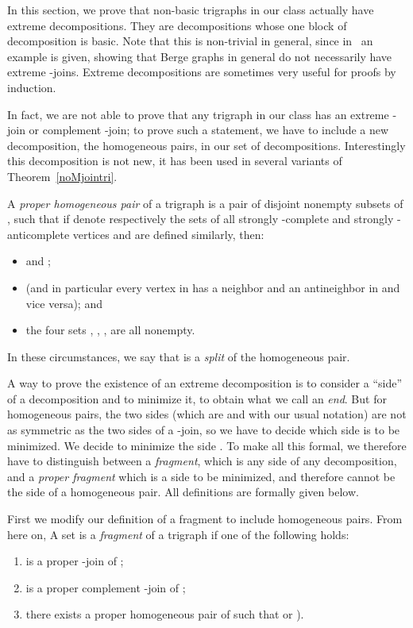 \documentclass[11 pt] {article}
\begin{document}
In this section, we prove that non-basic trigraphs in our class
actually have extreme decompositions. They are decompositions whose
one block of decomposition is basic. Note that this is non-trivial in
general, since in~\cite{nicolas.kristina:2-join} an example
is given, showing that Berge graphs in general do not necessarily have
extreme -joins.  Extreme decompositions are sometimes very useful
for proofs by induction.

In fact, we are not able to prove that any trigraph in our class has
an extreme -join or complement -join; to prove such a statement,
we have to include a new decomposition, the homogeneous pairs, in our
set of decompositions.  Interestingly this decomposition is not new,
it has been used in several variants of Theorem~\ref{noMjointri}.

A {\em proper homogeneous pair} of a trigraph  is a pair of
disjoint nonempty subsets  of , such that if 
denote respectively the sets of all strongly -complete and strongly
-anticomplete vertices and  are defined similarly, then:
\begin{itemize}
\item  and ;
\item 
(and in particular every vertex in  has a neighbor and an 
antineighbor in  and vice versa); and 
\item the four sets , , , 
 are all nonempty.
\end{itemize}

In these circumstances, we say that  is a \emph{split} of the homogeneous
pair.

A way to prove the existence of an extreme decomposition is to
consider a ``side'' of a decomposition and to minimize it, to obtain
what we call an \emph{end}.  But for homogeneous pairs, the two sides
(which are  and  with our usual
notation) are not as symmetric as the two sides of a -join, so we
have to decide which side is to be minimized.  We decide to minimize
the side .  To make all this formal, we therefore have to
distinguish between a \emph{fragment}, which is any side of any
decomposition, and a \emph{proper fragment} which is a side to be
minimized, and therefore cannot be the side  of a homogeneous pair.  All definitions are formally given below.

First we modify our definition of a fragment to include
homogeneous pairs. From here on, A set  is a
\emph{fragment} of a trigraph  if one of the following holds:

\begin{enumerate}
\item\label{i:2J}  is a proper -join of ;
\item\label{i:C2J}  is a proper complement -join of ;
\item there exists a proper homogeneous pair  of  such that
 or ). 
\end{enumerate}
\end{document}

